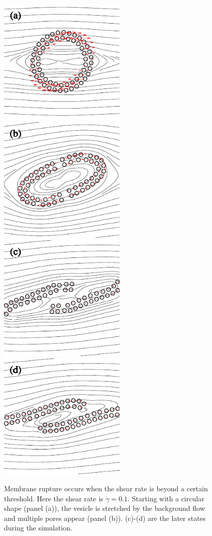 \documentclass[lineno]{jfm}
\begin{document}
\begin{figure}
\centering
\includegraphics[height=2.4in]{N58_rupt_0.pdf}
\includegraphics[height=2.4in]{N58_rupt_200.pdf}
\\
\includegraphics[height=2.4in]{N58_rupt_400.pdf}
\includegraphics[height=2.4in]{N58_rupt_600.pdf}
  \caption{Membrane rupture occurs when the shear rate is beyond a certain threshold. Here the shear rate is $\dot\gamma = 0.1$. Starting with a circular shape (panel (a)), the vesicle is stretched by the background flow and multiple pores appear (panel (b)). (c)-(d) are the later states during the simulation.
  }
    \label{figure7}
\end{figure}
\end{document}
